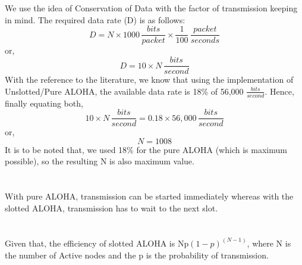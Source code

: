 \documentclass[12pt]{article}
\begin{document}
\maketitle


\section{}

We use the idea of Conservation of Data with the factor of transmission keeping in mind. The required data rate (D) is as follows:
\begin{equation*}
    D = N \times 1000 \, \frac{bits}{packet} \times \frac{1}{100} \, \frac{packet}{seconds}
\end{equation*}
or,
\begin{equation*}
    D = 10 \times N \, \frac{bits}{second}    
\end{equation*}
With the reference to the literature, we know that using the implementation of Unslotted/Pure ALOHA, the available data rate is 18\% of 56,000 $\frac{bits}{second}$.
Hence, finally equating both,
\begin{equation*}
    10 \times N \, \frac{bits}{second} = 0.18 \times 56,000\, \frac{bits}{second}
\end{equation*}
or,
\begin{equation*}
    N = 1008
\end{equation*}
It is to be noted that, we used 18\% for the pure ALOHA (which is maximum possible), so the resulting N is also maximum value.


\section{}

With pure ALOHA, transmission can be started immediately whereas with the slotted ALOHA, transmission has to wait to the next slot.


\section{}

Given that, the efficiency of slotted ALOHA is Np$(1-p)^{(N-1)}$, where N is the number of Active nodes and the p is the probability of transmission.
\end{document}
